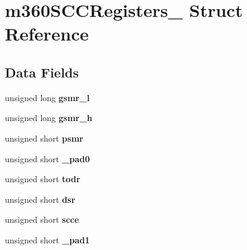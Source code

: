 \hypertarget{structm360SCCRegisters__}{}\section{m360\+S\+C\+C\+Registers\+\_\+ Struct Reference}
\label{structm360SCCRegisters__}
\subsection*{Data Fields}
\begin{DoxyCompactItemize}
\item 
\mbox{\label{structm360SCCRegisters___ae3d04a31f0612e4686e0c061ec01b870}} 
unsigned long {\bfseries gsmr\+\_\+l}
\item 
\mbox{\label{structm360SCCRegisters___a46941a3a10208981e44e22734bae1502}} 
unsigned long {\bfseries gsmr\+\_\+h}
\item 
\mbox{\label{structm360SCCRegisters___a439a463af3eb109687420ad95452a634}} 
unsigned short {\bfseries psmr}
\item 
\mbox{\label{structm360SCCRegisters___a6349ee5a96ebe456ab81a2da0c4aa94e}} 
unsigned short {\bfseries \+\_\+pad0}
\item 
\mbox{\label{structm360SCCRegisters___a4640ed0e74631d0621bdbf3262aa137e}} 
unsigned short {\bfseries todr}
\item 
\mbox{\label{structm360SCCRegisters___ad8784aa05feeac72b877a4bdcb1943e0}} 
unsigned short {\bfseries dsr}
\item 
\mbox{\label{structm360SCCRegisters___a0181b3965bbcbd225d73d407b5bf4ac8}} 
unsigned short {\bfseries scce}
\item 
\mbox{\label{structm360SCCRegisters___ae8f5a83dae5866e04934e92a66fc0e5d}} 
unsigned short {\bfseries \+\_\+pad1}
\item 
\mbox{\label{structm360SCCRegisters___aa482c428bb69b88b3b19daabe5aa3103}} 

\end{DoxyCompactItemize}
